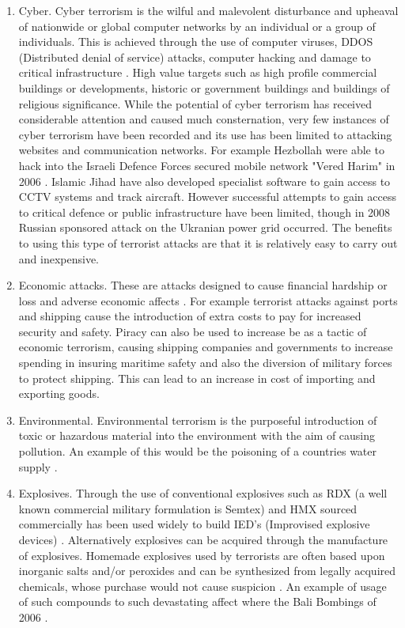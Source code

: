 \begin{enumerate}
\item Cyber. Cyber terrorism is the wilful and malevolent disturbance and upheaval of nationwide or global computer networks by an individual or a group of individuals. This is achieved through the use of computer viruses, DDOS (Distributed denial of service) attacks, computer hacking and damage to critical infrastructure \citep{Golandsky2016}. High value targets  such as high profile commercial buildings or developments, historic or government buildings and buildings of religious significance. While the potential of cyber terrorism has received considerable attention and caused much consternation, very few instances of cyber terrorism have been recorded and its use has been limited to attacking websites and communication networks. For example Hezbollah were able to hack into the Israeli Defence Forces secured mobile network "Vered Harim" in 2006 \citep{Golandsky2016}. Islamic Jihad have also developed specialist software to gain access to CCTV systems and track aircraft. However successful attempts to gain access to critical defence or public infrastructure have been limited, though in 2008 Russian sponsored attack on the Ukranian power grid \citep{Cybersecurity2016Perez} occurred. The benefits to using this type of terrorist attacks are that it is relatively easy to carry out and inexpensive. 
\item Economic attacks. These are attacks designed to cause financial hardship or loss and adverse economic affects \citep{drake1998role}. For example terrorist attacks against ports and shipping cause the introduction of extra costs to pay for increased security and safety. Piracy can also be used to increase be as a tactic of economic terrorism, causing shipping companies and governments to increase spending in insuring maritime safety and also the diversion of military forces to protect shipping. This can lead to an increase in cost of importing and exporting goods. 
\item Environmental. Environmental terrorism is the purposeful introduction of toxic or hazardous material into the environment with the aim of causing pollution. An example of this would be the poisoning of a countries water supply \citep{gleick2006water}.
\item Explosives. Through the use of conventional explosives such as RDX (a well known commercial military formulation is Semtex) and HMX sourced commercially has been used widely to build IED's (Improvised explosive devices) \citep{kopp2008technology}. Alternatively explosives can be acquired through the manufacture of explosives. Homemade explosives used by terrorists are often based upon inorganic salts and/or peroxides and can be synthesized from legally acquired chemicals, whose purchase would not cause suspicion \citep{johns2008identification}.  An example of usage of such compounds to such devastating affect where the Bali Bombings of 2006 \citep{royds2005case}.

\end{enumerate}
